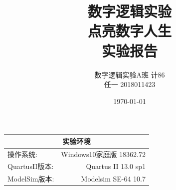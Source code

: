 \documentclass[UTF8]{article}
\title{\textbf{数字逻辑实验} \\ \textbf{点亮数字人生} \\ \textbf{实验报告}} %
\author{数字逻辑实验A班  \quad 计86 \\ 任一 2018011423} %
\date{\today} %
\begin{document}
\maketitle %





\begin{center}
    \begin{tabular}{l  r}
    \hline

        \multicolumn{2}{c}{实验环境} \\ \hline
        操作系统: & Windows10家庭版 18362.72 \\ \hline%
        QuartusII版本: & Quartus II 13.0 sp1 \\ \hline%

        ModelSim版本: & Modelsim SE-64 10.7 \\ \hline%

    \end{tabular}
\end{center}
\end{document}
